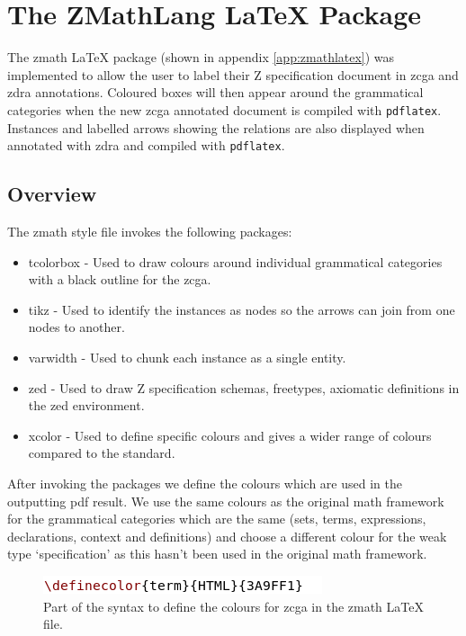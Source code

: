 \section{The ZMathLang LaTeX Package}

The \gls{zmath} \LaTeX{} package (shown in appendix \ref{app:zmathlatex}) was implemented to allow the user to label their Z specification document in \gls{zcga} and \gls{zdra} annotations. Coloured boxes will then appear around the grammatical categories when the new \gls{zcga} annotated document is compiled with \texttt{pdflatex}. Instances and labelled arrows showing the relations are also displayed when annotated with \gls{zdra} and compiled with \texttt{pdflatex}. 

\subsection{Overview}

The \gls{zmath} style file invokes the following packages:

\begin{itemize}
\item tcolorbox - Used to draw colours around individual grammatical categories with a black outline for the \gls{zcga}.
\item tikz - Used to identify the instances as nodes so the arrows can join from one nodes to another.
\item varwidth - Used to chunk each instance as a single entity.
\item zed - Used to draw Z specification schemas, freetypes, axiomatic definitions in the zed environment.
\item xcolor - Used to define specific colours and gives a wider range of colours compared to the standard.
\end{itemize}

After invoking the packages we define the colours which are used in the outputting pdf result. We use the same colours as the original \gls{math} framework for the grammatical categories which are the same (sets, terms, expressions, declarations, context and definitions) and choose a different colour for the weak type `specification' as this hasn't been used in the original \gls{math} framework.

\begin{figure}[H]
\includegraphics[scale=0.7]{Figures/Design/zmatha.png}
\caption{Part of the syntax to define the colours for \gls{zcga} in the \gls{zmath} \LaTeX{} file. \label{fig:definecolourlatex}}
\end{figure}

